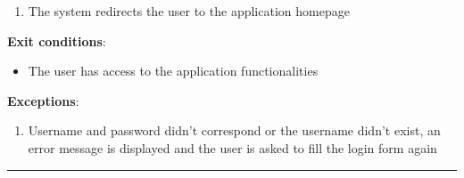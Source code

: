 \begin{enumerate}
\begin{itemize}
\begin{enumerate}
			\item{The system redirects the user to the application homepage}
		\end{enumerate}
		\textbf{Exit conditions}:
		\begin{itemize}
			\item{The user has access to the application functionalities}
		\end{itemize}
		\textbf{Exceptions}:
		\begin{enumerate}
      		\item{Username and password didn’t correspond or the username didn’t exist, an error message is displayed and the user is asked to ﬁll the login form again}
 		   \end{enumerate}
		\rule{\linewidth}{0.4pt}


\end{itemize}
\end{enumerate}
